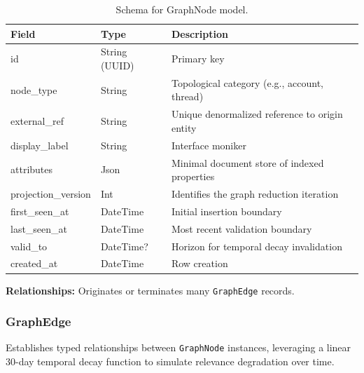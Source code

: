 \begin{table}[h]
\centering
\begin{tabular}{|l|l|l|}
\hline
\textbf{Field} & \textbf{Type} & \textbf{Description} \\
\hline
id & String (UUID) & Primary key \\
node\_type & String & Topological category (e.g., account, thread) \\
external\_ref & String & Unique denormalized reference to origin entity \\
display\_label & String & Interface moniker \\
attributes & Json & Minimal document store of indexed properties \\
projection\_version & Int & Identifies the graph reduction iteration \\
first\_seen\_at & DateTime & Initial insertion boundary \\
last\_seen\_at & DateTime & Most recent validation boundary \\
valid\_to & DateTime? & Horizon for temporal decay invalidation \\
created\_at & DateTime & Row creation \\
\hline
\end{tabular}
\caption{Schema for GraphNode model.}
\end{table}
\noindent \textbf{Relationships:} Originates or terminates many \texttt{GraphEdge} records.

\subsubsection{GraphEdge}
Establishes typed relationships between \texttt{GraphNode} instances, leveraging a linear 30-day temporal decay function to simulate relevance degradation over time.

